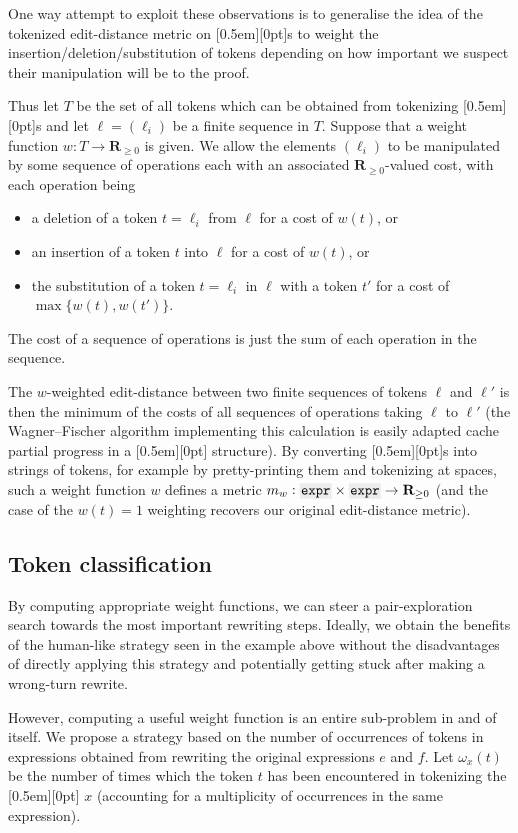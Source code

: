 \documentclass[a4paper]{article}
\DeclareMathOperator{\rws}{rws}
\newcommand{\RR}{\mathbf{R}}
\theoremstyle{plain}
\theoremstyle{definition}
\newcommand{\xx}[1]{{\colorbox{gray!15}{\raisebox{0em}[0.5em][0pt]{\makebox[\width-0.4em]{\texttt{#1}}}}}}
\newcommand{\expr}{\xx{expr}}
\begin{document}
One way attempt to exploit these observations is to generalise the idea of the tokenized edit-distance metric on \xx{expr}s to weight the insertion/deletion/substitution of tokens depending on how important we suspect their manipulation will be to the proof.

Thus let $T$ be the set of all tokens which can be obtained from tokenizing \expr{}s and let $\ell = (\ell_i)$ be a finite sequence in $T$. Suppose that a weight function $w : T \to \RR_{\geq 0}$ is given. We allow the elements $(\ell_i)$ to be manipulated by some sequence of operations each with an associated $\RR_{\geq 0}$-valued cost, with each operation being
\begin{itemize}
  \item a deletion of a token $t = \ell_i$ from $\ell$ for a cost of $w(t)$, or
  \item an insertion of a token $t$ into $\ell$ for a cost of $w(t)$, or
  \item the substitution of a token $t = \ell_i$ in $\ell$ with a token $t'$ for a cost of $\max\{w(t), w(t')\}$.
\end{itemize}
The cost of a sequence of operations is just the sum of each operation in the sequence.

The $w$-weighted edit-distance between two finite sequences of tokens $\ell$ and $\ell'$ is then the minimum of the costs of all sequences of operations taking $\ell$ to $\ell'$ (the Wagner--Fischer algorithm \cite{wagner1974string} implementing this calculation is easily adapted cache partial progress in a \xx{dist\_est} structure). By converting \expr{}s{} into strings of tokens, for example by pretty-printing them and tokenizing at spaces, such a weight function $w$ defines a metric $m_w : \expr{} \times \expr{} \to \RR_{\geq 0}$ (and the case of the $w(t) = 1$ weighting recovers our original edit-distance metric).

\subsection{Token classification}

By computing appropriate weight functions, we can steer a pair-exploration search towards the most important rewriting steps. Ideally, we obtain the benefits of the human-like strategy seen in the example above without the disadvantages of directly applying this strategy and potentially getting stuck after making a wrong-turn rewrite.

However, computing a useful weight function is an entire sub-problem in and of itself. We propose a strategy based on the number of occurrences of tokens in expressions obtained from rewriting the original expressions $e$ and $f$. Let $\omega_x(t)$ be the number of times which the token $t$ has been encountered in tokenizing the \expr{} $x$ (accounting for a multiplicity of occurrences in the same expression).
\end{document}
